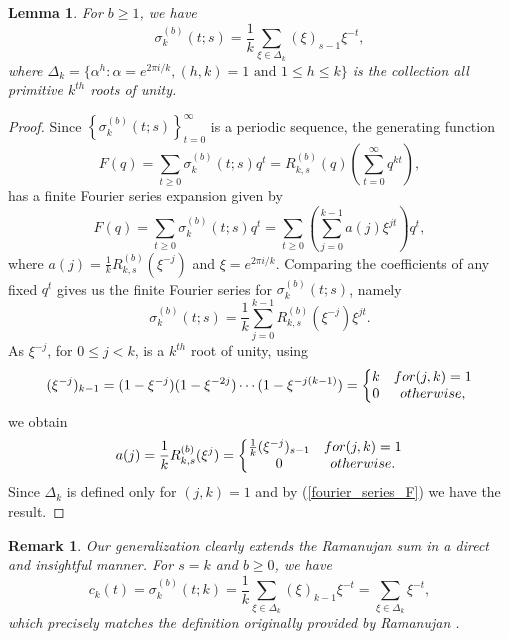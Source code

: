 \documentclass[12pt]{article}
\newtheorem{lem}[thm]{Lemma}%
\newtheorem{rema}{Remark}[subsection]%
\begin{document}
\begin{lem} \label{lem_freq_1}
For $b\geq 1$, we have 
\begin{equation}\label{sigma_freq_1}
\sigma^{(b)}_{k}(t;s) = \frac{1}{k}\sum_{\xi\in \Delta_{k}} (\xi)_{s-1}\xi^{-t},     
\end{equation}
where $\Delta_{k}=\{\alpha^{h}:\alpha = e^{2\pi i/k}, (h,k)=1 \text{ and } 1\leq h\leq k\}$ is the collection all primitive $k^{th}$ roots of unity.     
\end{lem}


\begin{proof}
 Since $\left\{\sigma_{k}^{(b)}(t;s)\right\}_{t=0}^{\infty}$ is a periodic sequence, the generating function
$$
F(q)=\sum_{t\geq 0} \sigma_{k}^{(b)}(t;s) q^{t} = R_{k,s}^{(b)}(q)\left(\sum_{t=0}^{\infty}q^{kt}\right),
$$
has a finite Fourier series expansion given by 
\begin{equation}\label{fourier_series_F}
F(q) = \sum_{t\geq 0} \sigma_{k}^{(b)}(t;s) q^{t} = \sum_{t\geq 0} \left(\sum_{j=0}^{k-1} a(j)\xi^{jt}\right) q^{t},    
\end{equation}
where $a(j)=\frac{1}{k}R_{k,s}^{(b)}(\xi^{-j})$ and $\xi=e^{2\pi i/k}$. Comparing the coefficients of any fixed $q^{t}$ gives us the finite Fourier series for $\sigma_{k}^{(b)}(t;s)$, namely 
$$
\sigma_{k}^{(b)}(t;s) = \frac{1}{k}\sum_{j=0}^{k-1}R_{k,s}^{(b)}(\xi^{-j})\xi^{jt}.
$$
As $\xi^{-j}$, for $0\leq j<k$, is a $k^{th}$ root of unity, using  
$$
(\xi^{-j})_{k-1} = (1-\xi^{-j})(1-\xi^{-2j})\cdots (1-\xi^{-j(k-1)})= \left\{\begin{matrix} 
k & \textnormal{ for } (j,k)=1\\
0 & \textnormal { otherwise },
\end{matrix}\right. 
$$
we obtain
$$
a(j)=\frac{1}{k}R_{k,s}^{(b)}(\xi^{j})=\left\{\begin{matrix} 
\frac{1}{k}(\xi^{-j})_{s-1} & \textnormal{ for } (j,k)=1\\
0 & \textnormal { otherwise }. 
\end{matrix}\right.
$$
Since $\Delta_{k}$ is defined only for $(j,k)=1$ and by (\ref{fourier_series_F}) we have the result. 
\end{proof}

\begin{rema} 
Our generalization clearly extends the Ramanujan sum in a direct and insightful manner. For \( s = k \) and \( b \geq 0 \), we have
\[
c_{k}(t) = \sigma_{k}^{(b)}(t; k) = \frac{1}{k} \sum_{\xi \in \Delta_{k}} (\xi)_{k-1} \xi^{-t} = \sum_{\xi \in \Delta_{k}} \xi^{-t},
\]
which precisely matches the definition originally provided by Ramanujan \cite{Rama}.
\end{rema}
\end{document}
